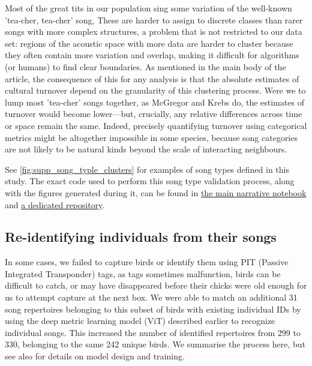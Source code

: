 \documentclass[9pt, onecolumn, twoside, lineno]{gsajnl}
\begin{document}
Most of the great tits in our population sing some variation of the well-known 'tea-cher, tea-cher' song, These are harder to assign to discrete classes than rarer songs with more complex structures, a problem that is not restricted to our data set: regions of the acoustic space with more data are harder to cluster because they often contain more variation and overlap, making it difficult for algorithms (or humans) to find clear boundaries. As mentioned in the main body of the article, the consequence of this for any analysis is that the absolute estimates of cultural turnover depend on the granularity of this clustering process. Were we to lump most 'tea-cher' songs together, as McGregor and Krebs \autocite{mcgregor1982b} do, the estimates of turnover would become lower---but, crucially, any relative differences across time or space remain the same. Indeed, precisely quantifying turnover using categorical metrics might be altogether impossible in some species, because song categories are not likely to be natural kinds beyond the scale of interacting neighbours. 

See \autoref{fig:supp_song_typle_clusters} for examples of song types defined in this study. The exact code used to perform this song type validation process, along with the figures generated during it, can be found in \href{https://github.com/nilomr/wytham-songtype-validation/blob/main/notebooks/4_train-model.ipynb}{the main narrative notebook} and \href{https://github.com/nilomr/wytham-songtype-validation}{a dedicated repository}.

\subsection{Re-identifying individuals from their songs}

In some cases, we failed to capture birds or identify them using PIT (Passive Integrated Transponder) tags, as tags sometimes malfunction, birds can be difficult to catch, or may have disappeared before their chicks were old enough for us to attempt capture at the next box. We were able to match an additional 31 song repertoires belonging to this subset of birds with existing individual IDs by using the deep metric learning model (ViT) described earlier to recognize individual songs. This increased the number of identified repertoires from 299 to 330, belonging to the same 242 unique birds. We summarise the process here, but see also \autocite{merinorecalde2024} for details on model design and training.
\end{document}
